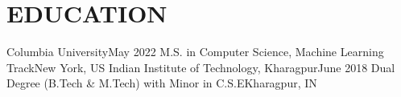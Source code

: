 \section{\large \textbf{EDUCATION}}
    \resumeSubHeadingListStart

    \resumeSubheading
    {\normalsize Columbia University}{\small May 2022}
    {\footnotesize M.S. in Computer Science, Machine Learning Track}{\footnotesize New York, US}
    \vspace{5pt}
    \resumeSubheading
    {\normalsize Indian Institute of Technology, Kharagpur}{\small June 2018}
    {\footnotesize Dual Degree (B.Tech \& M.Tech) with Minor in C.S.E}{\footnotesize Kharagpur, IN}

    \resumeSubHeadingListEnd